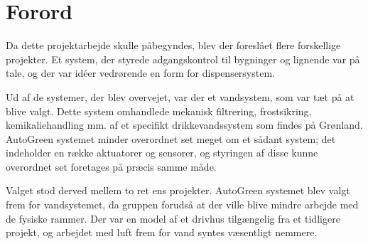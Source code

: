 \chapter{Forord}
\label{ch:Forord}

Da dette projektarbejde skulle påbegyndes, blev der foreslået flere forskellige projekter. 
Et system, der styrede adgangskontrol til bygninger og lignende var på tale, og der var idéer vedrørende en form for dispensersystem.

Ud af de systemer, der blev overvejet, var der et vandsystem, som var tæt på at blive valgt. 
Dette system omhandlede mekanisk filtrering, frostsikring, kemikaliehandling mm. af et specifikt drikkevandssystem som findes på Grønland.
AutoGreen systemet minder overordnet set meget om et sådant system; det indeholder en række aktuatorer og sensorer, og styringen af disse kunne overordnet set foretages på præcis samme måde. 

Valget stod derved mellem to ret ens projekter.
AutoGreen systemet blev valgt frem for vandsystemet, da gruppen forudså at der ville blive mindre arbejde med de fysiske rammer. 
Der var en model af et drivhus tilgængelig fra et tidligere projekt, og arbejdet med luft frem for vand syntes væsentligt nemmere. 

\clearpage